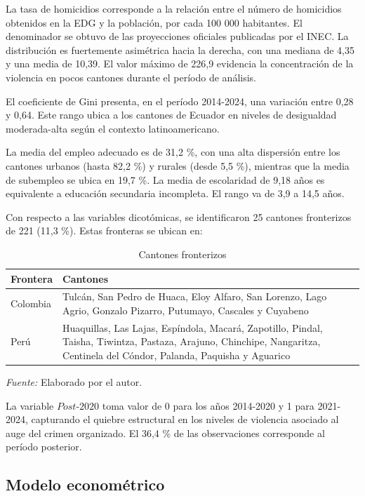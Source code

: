 \documentclass[12pt,a4paper]{article}
\newcommand{\Fuente}[1]{%
  \par{\fontsize{11}{13}\selectfont\textit{Fuente:} #1\par}
}
\begin{document}
La tasa de homicidios corresponde a la relación entre el número de homicidios obtenidos en la EDG y la población, por cada 100 000 habitantes. El denominador se obtuvo de las proyecciones oficiales publicadas por el INEC. La distribución es fuertemente asimétrica hacia la derecha, con una mediana de 4,35 y una media de 10,39. El valor máximo de 226,9 evidencia la concentración de la violencia en pocos cantones durante el período de análisis.

El coeficiente de Gini presenta, en el período 2014-2024, una variación entre 0,28 y 0,64. Este rango ubica a los cantones de Ecuador en niveles de desigualdad moderada-alta según el contexto latinoamericano.

La media del empleo adecuado es de 31,2 \%, con una alta dispersión entre los cantones urbanos (hasta 82,2 \%) y rurales (desde 5,5 \%), mientras que la media de subempleo se ubica en 19,7 \%. La media de escolaridad de 9,18 años es equivalente a educación secundaria incompleta. El rango va de 3,9 a 14,5 años.

Con respecto a las variables dicotómicas, se identificaron 25 cantones fronterizos de 221 (11,3 \%). Estas fronteras se ubican en:

\begin{table}[H]
\caption{Cantones fronterizos}
{\fontsize{11}{13}\selectfont
\begin{tabularx}{\textwidth}{>{\RaggedRight\arraybackslash}p{2.5cm} X}
\toprule
Frontera & Cantones \\
\midrule
Colombia & Tulcán, San Pedro de Huaca, Eloy Alfaro, San Lorenzo, Lago Agrio, Gonzalo Pizarro, Putumayo, Cascales y Cuyabeno \\
Perú & Huaquillas, Las Lajas, Espíndola, Macará, Zapotillo, Pindal, Taisha, Tiwintza, Pastaza, Arajuno, Chinchipe, Nangaritza, Centinela del Cóndor, Palanda, Paquisha y Aguarico \\
\bottomrule
\end{tabularx}
}
\Fuente{Elaborado por el autor.}
\end{table}

La variable \(Post\text{-}2020\) toma valor de 0 para los años 2014-2020 y 1 para 2021-2024, capturando el quiebre estructural en los niveles de violencia asociado al auge del crimen organizado. El 36,4 \% de las observaciones corresponde al período posterior.

\subsection*{Modelo econométrico}
\end{document}
